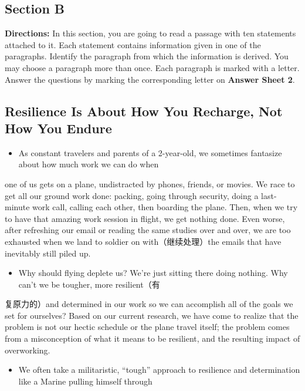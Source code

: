 \documentclass[UTF8,11pt]{ctexart}
\begin{document}
\subsection*{\textbf{Section B}}


\textbf{Directions:} In this section, you are going to read a passage with ten statements attached to it. Each statement contains information given in one of the paragraphs. Identify the paragraph from which the information is derived. You may choose a paragraph more than once. Each paragraph is marked with a letter. Answer the questions by marking the corresponding letter on\textbf{ Answer Sheet 2}.


\subsection*{\textbf{Resilience Is About How You Recharge, Not How You Endure}}


\begin{itemize}[leftmargin=2em,itemsep=.2em,topsep=.4em]\item[A.] As constant travelers and parents of a 2-year-old, we sometimes fantasize about how much work we can do when
\end{itemize}

one of us gets on a plane, undistracted by phones, friends, or movies. We race to get all our ground work done: packing, going through security, doing a last-minute work call, calling each other, then boarding the plane. Then, when we try to have that amazing work session in flight, we get nothing done. Even worse, after refreshing our email or reading the same studies over and over, we are too exhausted when we land to soldier on with（继续处理）the emails that have inevitably still piled up.


\begin{itemize}[leftmargin=2em,itemsep=.2em,topsep=.4em]\item[B.] Why should flying deplete us? We’re just sitting there doing nothing. Why can’t we be tougher, more resilient（有
\end{itemize}

复原力的）and determined in our work so we can accomplish all of the goals we set for ourselves? Based on our current research, we have come to realize that the problem is not our hectic schedule or the plane travel itself; the problem comes from a misconception of what it means to be resilient, and the resulting impact of overworking.


\begin{itemize}[leftmargin=2em,itemsep=.2em,topsep=.4em]\item[C.] We often take a militaristic, “tough” approach to resilience and determination like a Marine pulling himself through
\end{itemize}
\end{document}

